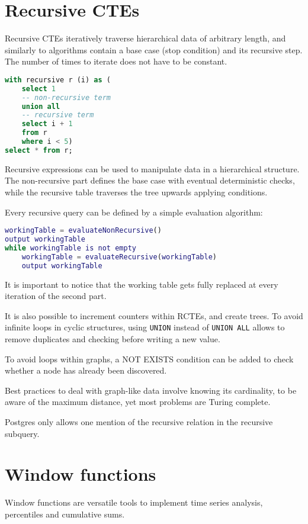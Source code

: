\section{Recursive CTEs}
Recursive CTEs iteratively traverse hierarchical data of arbitrary length, and similarly to algorithms contain a base case (stop condition) and its recursive step. The number of times to iterate does not have to be constant.

\begin{lstlisting}[language=SQL]
with recursive r (i) as (
	select 1
	-- non-recursive term
	union all
	-- recursive term
	select i + 1
	from r
	where i < 5)
select * from r;
\end{lstlisting}

Recursive expressions can be used to manipulate data in a hierarchical structure. The non-recursive part defines the base case with eventual deterministic checks, while the recursive table traverses the tree upwards applying conditions.

Every recursive query can be defined by a simple evaluation algorithm: 
\begin{lstlisting}[language=Matlab]
workingTable = evaluateNonRecursive()
output workingTable
while workingTable is not empty
	workingTable = evaluateRecursive(workingTable)
	output workingTable
\end{lstlisting}

It is important to notice that the working table gets fully replaced at every iteration of the second part.

It is also possible to increment counters within RCTEs, and create trees. To avoid infinite loops in cyclic structures, using \texttt{UNION} instead of \texttt{UNION ALL} allows to remove duplicates and checking before writing a new value.

To avoid loops within graphs, a NOT EXISTS condition can be added to check whether a node has already been discovered. 

Best practices to deal with graph-like data involve knowing its cardinality, to be aware of the maximum distance, yet most problems are Turing complete.

Postgres only allows one mention of the recursive relation in the recursive subquery.

\section{Window functions}
Window functions are versatile tools to implement time series analysis, percentiles and cumulative sums. 

